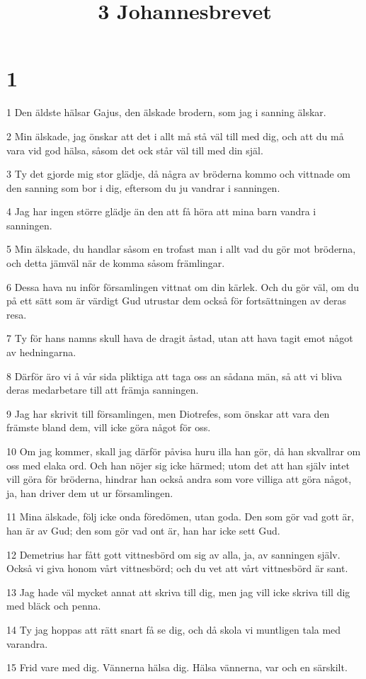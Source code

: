 

\title{3 Johannesbrevet}


\chapter{1}

\par 1 Den äldste hälsar Gajus, den älskade brodern, som jag i sanning älskar.
\par 2 Min älskade, jag önskar att det i allt må stå väl till med dig, och att du må vara vid god hälsa, såsom det ock står väl till med din själ.
\par 3 Ty det gjorde mig stor glädje, då några av bröderna kommo och vittnade om den sanning som bor i dig, eftersom du ju vandrar i sanningen.
\par 4 Jag har ingen större glädje än den att få höra att mina barn vandra i sanningen.
\par 5 Min älskade, du handlar såsom en trofast man i allt vad du gör mot bröderna, och detta jämväl när de komma såsom främlingar.
\par 6 Dessa hava nu inför församlingen vittnat om din kärlek. Och du gör väl, om du på ett sätt som är värdigt Gud utrustar dem också för fortsättningen av deras resa.
\par 7 Ty för hans namns skull hava de dragit åstad, utan att hava tagit emot något av hedningarna.
\par 8 Därför äro vi å vår sida pliktiga att taga oss an sådana män, så att vi bliva deras medarbetare till att främja sanningen.
\par 9 Jag har skrivit till församlingen, men Diotrefes, som önskar att vara den främste bland dem, vill icke göra något för oss.
\par 10 Om jag kommer, skall jag därför påvisa huru illa han gör, då han skvallrar om oss med elaka ord. Och han nöjer sig icke härmed; utom det att han själv intet vill göra för bröderna, hindrar han också andra som vore villiga att göra något, ja, han driver dem ut ur församlingen.
\par 11 Mina älskade, följ icke onda föredömen, utan goda. Den som gör vad gott är, han är av Gud; den som gör vad ont är, han har icke sett Gud.
\par 12 Demetrius har fått gott vittnesbörd om sig av alla, ja, av sanningen själv. Också vi giva honom vårt vittnesbörd; och du vet att vårt vittnesbörd är sant.
\par 13 Jag hade väl mycket annat att skriva till dig, men jag vill icke skriva till dig med bläck och penna.
\par 14 Ty jag hoppas att rätt snart få se dig, och då skola vi muntligen tala med varandra.
\par 15 Frid vare med dig. Vännerna hälsa dig. Hälsa vännerna, var och en särskilt.


